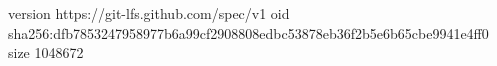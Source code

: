 version https://git-lfs.github.com/spec/v1
oid sha256:dfb7853247958977b6a99cf2908808edbc53878eb36f2b5e6b65cbe9941e4ff0
size 1048672
